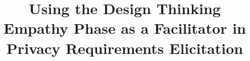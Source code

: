 \documentclass[conference]{IEEEtran}
\begin{document}
\title{Using the Design Thinking Empathy Phase as a Facilitator in Privacy Requirements Elicitation}

%
\maketitle
\end{document}
